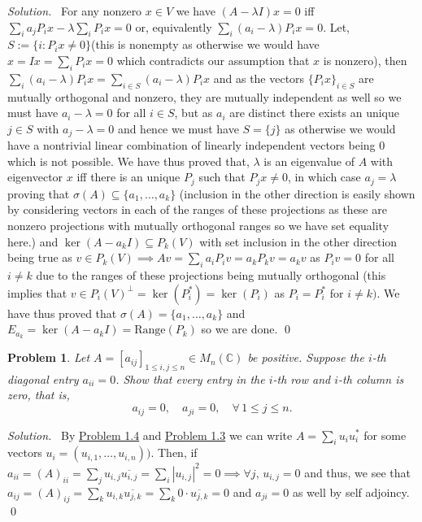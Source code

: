 \documentclass[12pt,a4paper]{article}
\newenvironment{solution}{%
  \par\noindent\textit{Solution.}\ }{\qed}
\theoremstyle{problemstyle}
\newtheorem{problem}{Problem}[section]
\begin{document}
\begin{solution}
	For any nonzero $x\in V$ we have $(A-\lambda I)x=0$ iff $\sum_ia_jP_ix-\lambda\sum_iP_ix=0$ or, equivalently $\sum_i(a_i-\lambda)P_ix=0$. 
	Let, $S:=\{i:P_ix\neq 0\}$(this is nonempty as otherwise we would have $x=Ix=\sum_iP_ix=0$ which contradicts our assumption that $x$ is nonzero), then $\sum_i(a_i-\lambda)P_ix=\sum_{i\in S}(a_i-\lambda)P_ix$ and as the vectors $\{P_ix\}_{i\in S}$ are mutually orthogonal and nonzero, they are mutually independent as well so we must have $a_i-\lambda=0$ for all $i\in S$, but as $a_i$ are distinct there exists an unique $j\in S$ with $a_j-\lambda=0$ and hence we must have $S=\{j\}$ as otherwise we would have a nontrivial linear combination of linearly independent vectors being $0$ which is not possible. 
	We have thus proved that, $\lambda$ is an eigenvalue of $A$ with eigenvector $x$ iff there is an unique $P_j$ such that $P_jx\neq 0$, in which case $a_j=\lambda$ proving that $\sigma(A)\subseteq\{a_1,\ldots,a_k\}$ (inclusion in the other direction is easily shown by considering vectors in each of the ranges of these projections as these are nonzero projections with mutually orthogonal ranges so we have set equality here.) and $\ker(A-a_kI)\subseteq P_k(V)$ with set inclusion in the other direction being true as $v\in P_k(V)\implies Av=\sum_ia_iP_iv=a_kP_kv=a_kv$ as $P_iv=0$ for all $i\neq k$ due to the ranges of these projections being mutually orthogonal (this implies that $v\in P_i(V)^\perp=\ker(P_i^*)=\ker(P_i)$ as $P_i=P_i^*$ for $i\neq k)$. 
	We have thus proved that $\sigma(A)=\{a_1,\ldots,a_k\}$ and $E_{a_k}=\ker(A-a_kI)=\text{Range}(P_k)$ so we are done.
\end{solution}
\begin{problem}\label{prob:4-9}
Let $A = [a_{ij}]_{1 \leq i,j \leq n} \in M_n(\mathbb{C})$ be positive. Suppose the $i$-th diagonal entry $a_{ii} = 0$. Show that every entry in the $i$-th row and $i$-th column is zero, that is,
\[
a_{ij} = 0, \quad a_{ji} = 0, \quad \forall\, 1 \leq j \leq n.
\]
\end{problem}
\begin{solution}
	By \hyperref[prob:4-4]{Problem 1.4} and \hyperref[prob:4-3]{Problem 1.3} we can write $A=\sum_i u_iu_i^*$ for some vectors $u_i=(u_{i,1},\ldots,u_{i,n}))$. 
	Then, if $a_{ii}=(A)_{ii}=\sum_ju_{i,j}\overline{u_{i,j}}=\sum_i|u_{i,j}|^2=0\implies\forall j,\,u_{i,j}=0$ and thus, we see that $a_{ij}=(A)_{ij}=\sum_ku_{i,k}\overline{u_{j,k}}=\sum_k0\cdot\overline{u_{j,k}}=0$ and $a_{ji}=0$ as well by self adjoincy.
\end{solution}
\end{document}

